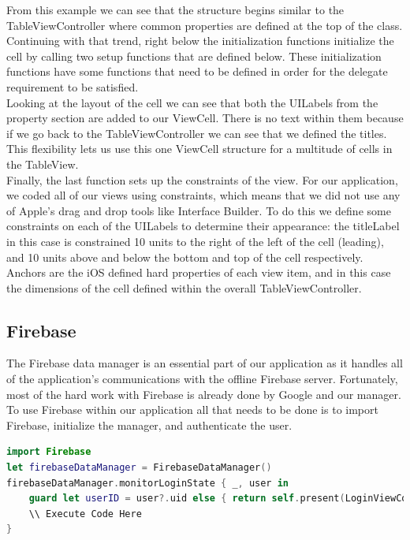 From this example we can see that the structure begins similar to the TableViewController where common properties are defined at the top of the class. Continuing with that trend, right below the initialization functions initialize the cell by calling two setup functions that are defined below. These initialization functions have some functions that need to be defined in order for the delegate requirement to be satisfied.\\

Looking at the layout of the cell we can see that both the UILabels from the property section are added to our ViewCell. There is no text within them because if we go back to the TableViewController we can see that we defined the titles. This flexibility lets us use this one ViewCell structure for a multitude of cells in the TableView.\\

Finally, the last function sets up the constraints of the view. For our application, we coded all of our views using constraints, which means that we did not use any of Apple's drag and drop tools like Interface Builder. To do this we define some constraints on each of the UILabels to determine their appearance: the titleLabel in this case is constrained 10 units to the right of the left of the cell (leading), and 10 units above and below the bottom and top of the cell respectively. Anchors are the iOS defined hard properties of each view item, and in this case the dimensions of the cell defined within the overall TableViewController.\\

\subsection{Firebase}

The Firebase data manager is an essential part of our application as it handles all of the application's communications with the offline Firebase server. Fortunately, most of the hard work with Firebase is already done by Google and our manager. To use Firebase within our application all that needs to be done is to import Firebase, initialize the manager, and authenticate the user.\\

\begin{lstlisting}[language=Swift]
import Firebase
let firebaseDataManager = FirebaseDataManager()
firebaseDataManager.monitorLoginState { _, user in
	guard let userID = user?.uid else { return self.present(LoginViewController(), animated: true, completion: nil) }
    \\ Execute Code Here        
}
\end{lstlisting}

